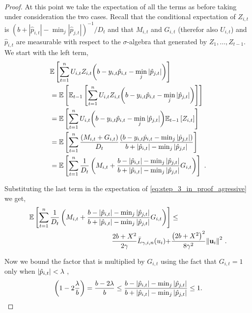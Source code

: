 {\begin{proof}
At this point we take  the expectation of all the terms as before taking under consideration the two cases.  Recall that the conditional expectation of $Z_{i,t}$ is
$(b+|\hat{p}_{i,t}|-\min_j| \hat{p}_{j,t}|)^{-1}/D_{t}$
and that $M_{i,t}$ and $G_{i,t}$ (therefor also $U_{i,t}$) and $\hat{p}_{i,t}$ are measurable with respect to the $\sigma$-algebra that generated by $Z_1,\ldots,Z_{t-1}$. 
We start with the left term,
\begin{align}
\begin{split}
&\mathbb{E}\left[{\sum_{t=1}^{n}U_{i,t}Z_{i,t}{\left({b-y_{i,t}\hat{p}_{i,t}-\min_{j}{\left\vert{ \hat{p}_{j,t}}\right\vert}}\right)}}\right]\\
&=\mathbb{E}\left[{\mathbb{E}_{t-1}\left[{{\sum_{t=1}^{n}{U_{i,t}Z_{i,t}{\left(b-y_{i,t}\hat{p}_{i,t}-\min_{j}{\left\vert{\hat{p}_{j,t}}\right\vert}\right)}}}}\right]}\right] \\
&=\mathbb{E}\left[{{\sum_{t=1}^{n}U_{i,t}{\left({b -y_{i,t}\hat{p}_{i,t}}-\min_{j}{\left\vert \hat{p}_{j,t} \right\vert}\right)}\mathbb{E}_{t-1}\left[{ Z_{i,t}}\right]}}\right]\\
&=\mathbb{E}\left[{\sum_{t=1}^{n}\frac{\left({M_{i,t}+G_{i,t}}\right)}{D_{t}}\frac{\left({b -y_{i,t}\hat{p}_{i,t}-\min_{j}\left\vert{\hat{p}_{j,t}}\right\vert}\right)}{b+\left\vert{\hat{p}_{i,t}}\right\vert-\min_{j}{\left\vert{\hat{p}_{j,t}}\right\vert}}}\right]\\
&=\mathbb{E}\left[{\sum_{t=1}^{n}{\frac{1}{D_{t}}\left({M_{i,t}+\frac{b-\left\vert{\hat{p}_{i,t}}\right\vert-\min_{j}{\left\vert{\hat{p}_{j,t}}\right\vert }}{b+\left\vert{\hat{p}_{i,t}}\right\vert-\min_{j}{\left\vert{\hat{p}_{j,t}}\right\vert}}G_{i,t} }\right)}}\right]~.
\label{eq:FO_cond_exp}
\end{split}
\end{align}

\noindent
Substituting the last term in the expectation of
\eqref{eq:step_3_in_proof_agressive} we get,
\begin{equation}
\begin{split}
\mathbb{E}\left[ \sum_{t=1}^{n}{\frac{1}{D_{t}}}\left({M_{i,t}+\frac{b-\left\vert{\hat{p}_{i,t}}\right\vert-\min_{j}{\left\vert{\hat{p}_{j,t}}\right\vert }}{b+\left\vert{\hat{p}_{i,t}}\right\vert-\min_{j}{\left\vert{\hat{p}_{j,t}}\right\vert}}G_{i,t} }\right) \right]
&\le \\ \frac{2b+X^2}{2\gamma}{\bar
  L}_{\gamma,i,n}(u_i)+&\frac{\left({2b+X^2}\right)^2}{8{\gamma}^2}{\left\Vert
    \mathbf{u}_{i} \right\Vert}^2~.
\label{step_3_in_proof_aggressive}
\end{split}
\end{equation} 

\noindent
Now we bound the factor that is multiplied by $G_{i,t}$ using the fact that $G_{i,t}=1$ only when 
$\left\vert{\hat{p}_{i,t}}\right\vert<\lambda$ ,
\begin{equation}
\label{eq:bound_on_agressive_multiplier}
\left({1-2\frac{\lambda}{b}}\right)=\frac{b-2\lambda}{b} \le\frac{b-\left\vert{\hat{p}_{i,t}}\right\vert-\min_{j}{\left\vert{\hat{p}_{j,t}}\right\vert }}{b+\left\vert{\hat{p}_{i,t}}\right\vert-\min_{j}{\left\vert{\hat{p}_{j,t}}\right\vert}}\le1.
\end{equation}


\end{proof}}

